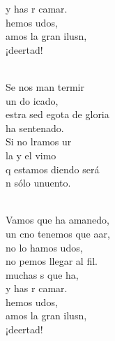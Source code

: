 \begin{cancion}
\begin{chorus}
	y has r camar.\\
	hemos udos,\\
	amos la gran ilusn, \\
	¡deertad!\\
	\end{chorus}%
	\jump\\
	Se nos man termir \\
	un do icado,\\
	estra sed egota de gloria\\
	 ha sentenado.\\
	Si no lramos ur\\
	la y el vimo\\
	q estamos diendo será\\
	n sólo unuento.\\\jump\\
	\begin{chorus}%
	Vamos que  ha amanedo,\\
	un cno tenemos que aar,\\
	no lo hamos udos,\\
	no pemos llegar al fil.\\
	 muchas s que ha,\\
	y has r camar.\\
	hemos udos,\\
	amos la gran ilusn, \\
	¡deertad!\\
	\end{chorus}%
	\jump\\
\end{cancion}%
